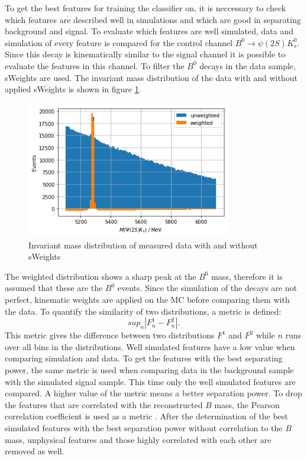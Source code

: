 To get the best features for training the classifier on, it is neccessary to check which features are described well in simulations and which are good in separating background and signal.
To evaluate which features are well simulated, data and simulation of every feature is compared for the control channel $B^0\to\psi(2S)K_s^0$.
Since this decay is kinematically similar to the signal channel it is possible to evaluate the features in this channel.
To filter the $B^0$ decays in the data sample, sWeights are used.
The invariant mass distribution of the data with and without applied sWeights is shown in figure \ref{fig:BM_Control_sweight}.
\begin{figure}[!htb]
  \centering
  \includegraphics[width=0.8\textwidth]{plots/BM_Control_sweights.png}
  \caption{Invariant mass distribution of measured data with and without sWeights}
  \label{fig:BM_Control_sweight}
\end{figure}
The weighted distribution shows a sharp peak at the $B^0$ mass, therefore it is assumed that these are the $B^0$ events.
Since the simulation of the decays are not perfect, kinematic weights are applied on the MC before comparing them with the data.
To quantify the similarity of two distributions, a metric is defined:
\begin{equation*}
  sup_n|F^1_n-F^2_n|.
\end{equation*}
This metric gives the difference between two distributions $F^1$ and $F^2$ while $n$ runs over all bins in the distributions.
Well simulated features have a low value when comparing simulation and data.
To get the features with the best separating power, the same metric is used when comparing data in the background sample with the simulated signal sample.
This time only the well simulated features are compared.
A higher value of the metric means a better separation power.
To drop the features that are correlated with the reconstructed $B$ mass, the Pearson correlation coefficient is used as a metric \cite{Pearson}.
After the determination of the best simulated features with the best separation power without correlation to the $B$ mass, unphysical features and those highly correlated with each other are removed as well.


